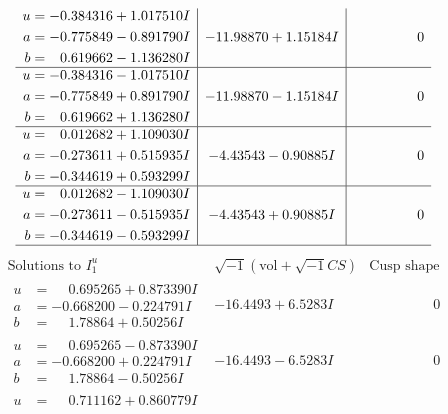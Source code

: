 \documentclass[1p]{elsarticle_modified}
\theoremstyle{definition}
\newcommand{\I}{\sqrt{-1}}
\begin{document}
$$\begin{array}{c|c|c}
\begin{aligned}
u &= -0.384316 + 1.017510 I \\
a &= -0.775849 - 0.891790 I \\
b &= \phantom{-}0.619662 - 1.136280 I\end{aligned}
 & -11.98870 + 1.15184 I & \phantom{-0.000000 } 0 \\ \hline\begin{aligned}
u &= -0.384316 - 1.017510 I \\
a &= -0.775849 + 0.891790 I \\
b &= \phantom{-}0.619662 + 1.136280 I\end{aligned}
 & -11.98870 - 1.15184 I & \phantom{-0.000000 } 0 \\ \hline\begin{aligned}
u &= \phantom{-}0.012682 + 1.109030 I \\
a &= -0.273611 + 0.515935 I \\
b &= -0.344619 + 0.593299 I\end{aligned}
 & -4.43543 - 0.90885 I & \phantom{-0.000000 } 0 \\ \hline\begin{aligned}
u &= \phantom{-}0.012682 - 1.109030 I \\
a &= -0.273611 - 0.515935 I \\
b &= -0.344619 - 0.593299 I\end{aligned}
 & -4.43543 + 0.90885 I & \phantom{-0.000000 } 0\\
 \hline 
 \end{array}$$\newpage$$\begin{array}{c|c|c}  
\text{Solutions to }I^u_{1}& \I (\text{vol} + \sqrt{-1}CS) & \text{Cusp shape}\\
 \hline 
\begin{aligned}
u &= \phantom{-}0.695265 + 0.873390 I \\
a &= -0.668200 - 0.224791 I \\
b &= \phantom{-}1.78864 + 0.50256 I\end{aligned}
 & -16.4493 + 6.5283 I & \phantom{-0.000000 } 0 \\ \hline\begin{aligned}
u &= \phantom{-}0.695265 - 0.873390 I \\
a &= -0.668200 + 0.224791 I \\
b &= \phantom{-}1.78864 - 0.50256 I\end{aligned}
 & -16.4493 - 6.5283 I & \phantom{-0.000000 } 0 \\ \hline\begin{aligned}
u &= \phantom{-}0.711162 + 0.860779 I \\

\end{aligned}
\end{array}$$
\end{document}
